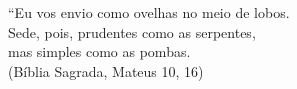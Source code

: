 ``Eu vos envio como ovelhas no meio de lobos. \\
Sede, pois, prudentes como as serpentes, \\
mas simples como as pombas.\\
(Bíblia Sagrada, Mateus 10, 16)